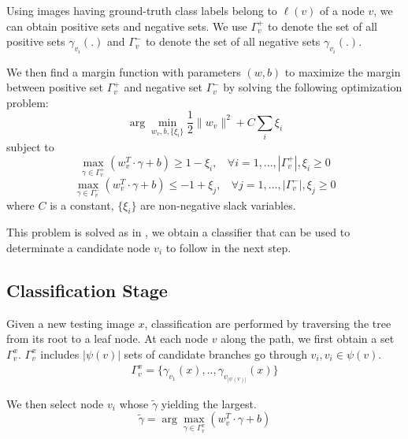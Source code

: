 \documentclass[review]{elsarticle}
\begin{document}
Using images having ground-truth class labels belong to $\ell(v)$ of a node $v$, we can obtain positive sets and negative sets. We use $\Gamma_{v}^{+} $ to denote the set of all positive sets $\gamma_{v_i}(.)$ and $\Gamma_{v}^{-} $ to denote the set of all negative sets $\gamma_{v_i}(.)$.

We then find a margin function with parameters $(w, b)$ to maximize the margin between positive set $\Gamma_{v}^{+} $ and negative set $\Gamma_{v}^{-} $ by solving the following optimization problem:
\begin{equation}
\arg\min_{w_{v}, b, \{\xi_i\}} \frac{1}{2} \|w_{v}\|^2 + C \sum_{i} \xi_i  
\end{equation}
subject to 
\begin{equation}
\max_{\gamma \in \Gamma_{v}^{+} } (w_{v}^T \cdot \gamma + b) \ge 1 - \xi_i, ~~~~ \forall i=1,...,|\Gamma_{v}^{+}| , \xi_i \ge 0
\end{equation}
\begin{equation}
\max_{\gamma \in \Gamma_{v}^{-} } (w_{v}^T \cdot \gamma + b) \leq -1 + \xi_j, ~~~~ \forall j=1,...,|\Gamma_{v}^{-}| , \xi_j \ge 0
\end{equation}
where $C$ is a constant, $\{\xi_i\}$ are non-negative slack variables.

This problem is solved as in \cite{AndrewsNIPS2002}, we obtain a classifier that can be used to determinate a candidate node $v_i$ to follow in the next step.

\subsection{Classification Stage} \label{sec:classification}

Given a new testing image $x$, classification are performed by traversing the tree from its root to a leaf node. At each node $v$ along the path, we first obtain a set  $\Gamma_{v}^x$. $\Gamma_{v}^x$ includes $|\psi(v)|$ sets of candidate branches go through $v_i, v_i \in \psi(v)$.  
\begin{align}
\Gamma_{v}^x = \{ \gamma_{v_1}(x),.., \gamma_{v_{|\psi(v)|}}(x) \} \label{eq:Gammax}
\end{align}

We then select node $v_i$ whose $\tilde{\gamma}$ yielding the largest.
\begin{equation}
\tilde{\gamma} = \arg\max_{\gamma \in \Gamma_{v}^x} (w_{v}^T \cdot \gamma + b) \label{eq:test}
\end{equation}
\end{document}
